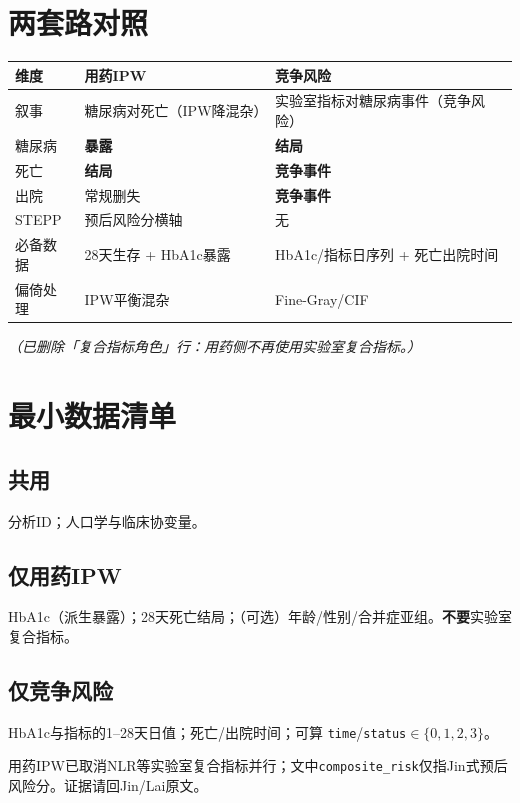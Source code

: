 \documentclass[11pt,a4paper]{article}
\begin{document}
\section{两套路对照}

\begin{tabularx}{\textwidth}{@{}L{0.20\textwidth}X X@{}}
\toprule
\textbf{维度} & \textbf{用药IPW} & \textbf{竞争风险} \\
\midrule
叙事 & 糖尿病对死亡（IPW降混杂） & 实验室指标对糖尿病事件（竞争风险） \\
糖尿病 & \textbf{暴露} & \textbf{结局} \\
死亡 & \textbf{结局} & \textbf{竞争事件} \\
出院 & 常规删失 & \textbf{竞争事件} \\
STEPP & 预后风险分横轴 & 无 \\
必备数据 & 28天生存 + HbA1c暴露 & HbA1c/指标日序列 + 死亡出院时间 \\
偏倚处理 & IPW平衡混杂 & Fine-Gray/CIF \\
\bottomrule
\end{tabularx}

\noindent\small\textit{（已删除「复合指标角色」行：用药侧不再使用实验室复合指标。）}

\section{最小数据清单}

\subsection*{共用}
分析ID；人口学与临床协变量。

\subsection*{仅用药IPW}
HbA1c（派生暴露）；28天死亡结局；（可选）年龄/性别/合并症亚组。\textbf{不要}实验室复合指标。

\subsection*{仅竞争风险}
HbA1c与指标的1--28天日值；死亡/出院时间；可算 \texttt{time}/\texttt{status}$\in\{0,1,2,3\}$。

\vspace{1em}
\noindent\small\color{gray!60!black}
用药IPW已取消NLR等实验室复合指标并行；文中\texttt{composite\_risk}仅指Jin式预后风险分。证据请回Jin/Lai原文。
\end{document}
